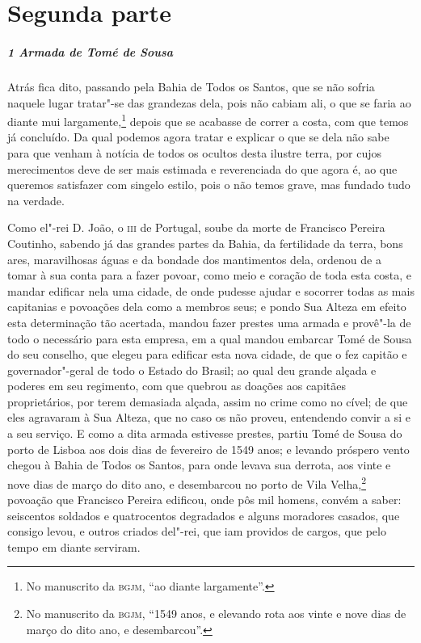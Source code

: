 \chapter[Segunda parte: Memorial e declaração]{Segunda parte }

\begin{linenumbers}

\paragraph{1 Armada de Tomé de Sousa} \quad
Atrás fica dito, passando pela Bahia de Todos os Santos, que se não sofria naquele lugar
tratar"-se das grandezas dela, pois não cabiam ali, o que se faria ao diante mui
largamente,\footnote{ No manuscrito da \textsc{bgjm}, ``ao diante largamente''.} depois
que se acabasse de correr a costa, com que temos já concluído. Da qual podemos agora
tratar e explicar o que se dela não sabe para que venham à notícia de todos os ocultos
desta ilustre terra, por cujos merecimentos deve de ser mais estimada e reverenciada do
que agora é, ao que queremos satisfazer com singelo estilo, pois o não temos grave, mas
fundado tudo na verdade.

Como el"-rei D. João, o \textsc{iii} de Portugal, soube da morte de Francisco Pereira
Coutinho, sabendo já das grandes partes da Bahia, da fertilidade da terra, bons ares,
maravilhosas águas e da bondade dos mantimentos dela, ordenou de a tomar à sua conta para
a fazer povoar, como meio e coração de toda esta costa, e mandar edificar nela uma cidade,
de onde pudesse ajudar e socorrer todas as mais capitanias e povoações dela como a membros
seus; e pondo Sua Alteza em efeito esta determinação tão acertada, mandou fazer prestes
uma armada e provê"-la de todo o necessário para esta empresa, em a qual mandou embarcar
Tomé de Sousa do seu conselho, que elegeu para edificar esta nova cidade, de que o fez
capitão e governador"-geral de todo o Estado do Brasil; ao qual deu grande alçada e poderes
em seu regimento, com que quebrou as doações aos capitães proprietários, por terem
demasiada alçada, assim no crime como no cível; de que eles agravaram à Sua Alteza, que no
caso os não proveu, entendendo convir a si e a seu serviço. E como a dita armada estivesse
prestes, partiu Tomé de Sousa do porto de Lisboa aos dois dias de fevereiro de 1549 anos;
e levando próspero vento chegou à Bahia de Todos os Santos, para onde levava sua derrota,
aos vinte e nove dias de março do dito ano, e desembarcou no porto de Vila
Velha,\footnote{ No manuscrito da \textsc{bgjm}, ``1549 anos, e elevando rota aos vinte e
nove dias de março do dito ano, e desembarcou''.} povoação que Francisco Pereira edificou,
onde pôs mil homens, convém a saber: seiscentos soldados e quatrocentos degradados e
alguns moradores casados, que consigo levou, e outros criados del"-rei, que iam providos de
cargos, que pelo tempo em diante serviram.


\end{linenumbers}
